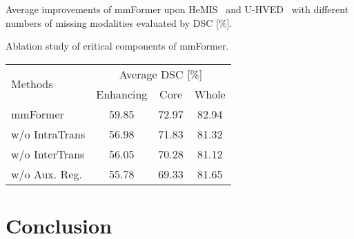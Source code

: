 \documentclass[runningheads]{llncs}
\begin{document}
\begin{center}
\begin{minipage}[!tp]{\textwidth}
\begin{minipage}[!tp]{0.48\textwidth}
\centering
\makeatletter{}
\caption{Average improvements of mmFormer upon HeMIS~\cite{havaei2016hemis} and U-HVED~\cite{dorent2019hetero} with different numbers of missing modalities evaluated by DSC [\%].}
\label{tab:improvement}
\end{minipage}
\begin{minipage}[!tp]{0.48\textwidth}
\centering
\makeatletter{}
\caption{Ablation study of critical components of mmFormer.}
\begin{tabular}{l|ccc}
\toprule
\multirow{2}{*}{Methods} & \multicolumn{3}{c}{Average DSC [\%]}                               \\ \cline{2-4} 
                         & Enhancing & Core & Whole \\ \midrule
mmFormer                 &  59.85  & 72.97  & 82.94   \\ \hline
w/o IntraTrans                 &  56.98  & 71.83   &  81.32  \\ \hline
w/o InterTrans                 &  56.05  & 70.28   &  81.12  \\ \hline
w/o Aux. Reg.                 &  55.78  & 69.33   &  81.65  \\ \bottomrule
\end{tabular}
\label{tab:ablation}
\end{minipage}
\end{minipage}
\end{center}

\section{Conclusion}
\label{sec:concolusion}
\end{document}
